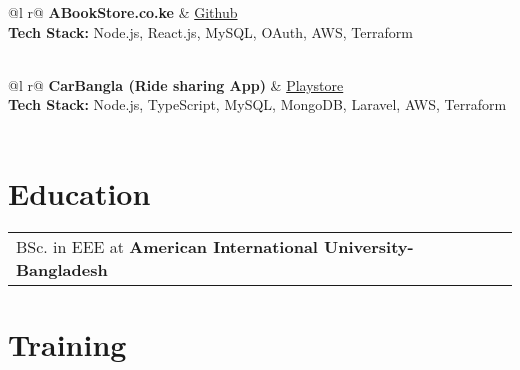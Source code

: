 \documentclass {article}
\begin{document}
\begin{tabularx}{\linewidth}{ @{}l r@{} }
    \Large\textbf{ABookStore.co.ke} & \hfill \href{https://github.com/imrulkk89/ABookStore}{Github} \\[3.75pt]  
    \textbf{Tech Stack:} Node.js, React.js, MySQL, OAuth, AWS, Terraform\\[3.75pt]
      \\
\end{tabularx}

\begin{tabularx}{\linewidth}{ @{}l r@{} }
    \Large\textbf{CarBangla (Ride sharing App)} & \hfill \href{https://play.google.com/store/apps/details?id=com.carbangla.user\&hl=en\&gl=US\&pli=1} {Playstore} \\[3.75pt]  
    \textbf{Tech Stack:} Node.js, TypeScript, MySQL, MongoDB, Laravel, AWS, Terraform\\[3.75pt]
      \\
\end{tabularx}


\section{Education}
\begin{tabularx}{\linewidth}{@{}l X@{}}	
BSc. in EEE at \textbf{American International University-Bangladesh} \hfill \normalsize \\
\end{tabularx}

\section{Training}
\end{document}
